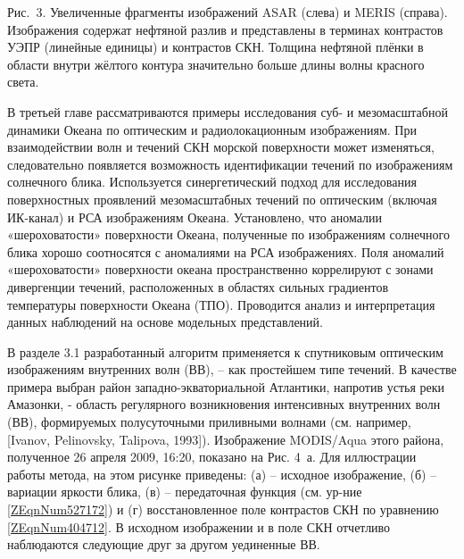 Рис.~3. Увеличенные фрагменты изображений ASAR (слева) и MERIS (справа). Изображения содержат нефтяной разлив и представлены в терминах контрастов УЭПР (линейные единицы) и контрастов СКН. Толщина нефтяной плёнки в области внутри жёлтого контура значительно больше длины волны красного света.



В третьей главе рассматриваются примеры исследования суб- и мезомасштабной динамики Океана по оптическим и радиолокационным изображениям. При взаимодействии волн и течений СКН морской поверхности может изменяться, следовательно появляется возможность идентификации течений по изображениям солнечного блика. Используется синергетический подход для исследования поверхностных проявлений мезомасштабных течений  по оптическим (включая ИК-канал) и РСА изображениям Океана. Установлено, что аномалии «шероховатости» поверхности Океана, полученные по изображениям солнечного блика хорошо соотносятся с аномалиями на РСА изображениях. Поля аномалий «шероховатости» поверхности океана пространственно коррелируют с зонами дивергенции течений, расположенных в областях сильных градиентов температуры поверхности Океана (ТПО). Проводится анализ и интерпретация данных наблюдений на основе модельных представлений.

В разделе 3.1 разработанный алгоритм применяется к спутниковым оптическим изображениям внутренних волн (ВВ), -- как простейшем типе течений. В качестве примера выбран район западно-экваториальной Атлантики, напротив устья реки Амазонки, - область регулярного возникновения интенсивных внутренних волн (ВВ), формируемых полусуточными приливными волнами (см. например, [Ivanov, Pelinovsky, Talipova, 1993]). Изображение MODIS/Aqua этого района, полученное 26 апреля 2009, 16:20, показано на Рис. 4~а. Для иллюстрации работы метода, на этом рисунке приведены: (а) -- исходное изображение, (б) -- вариации яркости блика, (в) -- передаточная функция (см. ур-ние \eqref{ZEqnNum527172}) и (г) восстановленное поле контрастов СКН по уравнению \eqref{ZEqnNum404712}. В исходном изображении и в поле СКН отчетливо наблюдаются следующие друг за другом уединенные ВВ.


